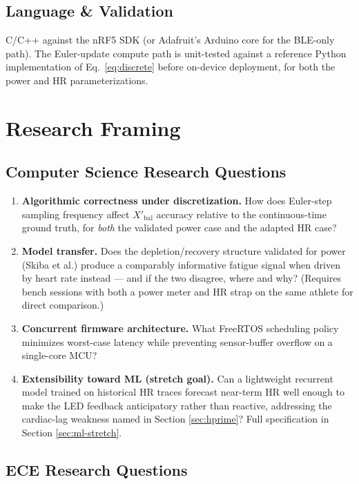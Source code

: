\documentclass[11pt, letterpaper]{article}
\begin{document}
\subsection{Language \& Validation}

C/C++ against the nRF5 SDK (or Adafruit's Arduino core for the BLE-only path). The Euler-update
compute path is unit-tested against a reference Python implementation of Eq.~\eqref{eq:discrete}
before on-device deployment, for both the power and HR parameterizations.

\section{Research Framing}

\subsection{Computer Science Research Questions}
\label{sec:cs-questions}

\begin{enumerate}
  \item \textbf{Algorithmic correctness under discretization.} How does Euler-step sampling
    frequency affect $X'_{\mathrm{bal}}$ accuracy relative to the continuous-time ground truth,
    for \emph{both} the validated power case and the adapted HR case?
  \item \textbf{Model transfer.} Does the depletion/recovery structure validated for power
    (Skiba et al.) produce a comparably informative fatigue signal when driven by heart rate
    instead --- and if the two disagree, where and why? (Requires bench sessions with both a
    power meter and HR strap on the same athlete for direct comparison.)
  \item \textbf{Concurrent firmware architecture.} What FreeRTOS scheduling policy minimizes
    worst-case latency while preventing sensor-buffer overflow on a single-core MCU?
  \item \textbf{Extensibility toward ML (stretch goal).} Can a lightweight recurrent model
    trained on historical HR traces forecast near-term HR well enough to make the LED feedback
    anticipatory rather than reactive, addressing the cardiac-lag weakness named in Section
    \ref{sec:hprime}? Full specification in Section \ref{sec:ml-stretch}.
\end{enumerate}

\subsection{ECE Research Questions}
\end{document}
